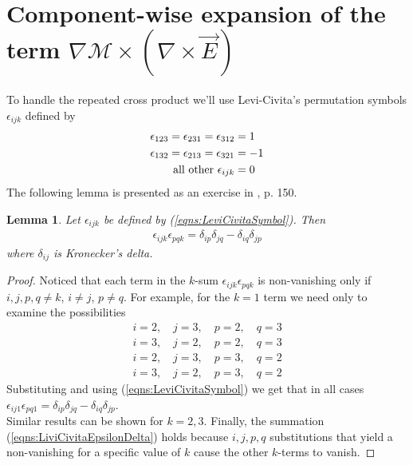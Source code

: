 \documentclass[twocolumn,secnumarabic,amssymb, nobibnotes, aps, prd]{revtex4-1}
\newtheorem{lem}{Lemma}[subsubsection]
\newtheorem{proof}{Proof}[subsubsection]
\begin{document}
\section{Component-wise expansion of the term $\nabla \mathcal{M} \times \left(\nabla \times \vec{E} \right) $}

\label{append:GradLogTermComponenetwiseDeriv}
To handle the repeated cross product we'll use Levi-Civita's permutation symbols $\epsilon_{ijk}$ \cite{ArfkenWeber2005} defined by
\begin{align}
\label{eqns:LeviCivitaSymbol}
\epsilon_{123} = \epsilon_{231} = \epsilon_{312} & = 1	\notag\\
\epsilon_{132} = \epsilon_{213} = \epsilon_{321} &= -1 \\
\text{all other } \epsilon_{ijk} &= 0	\notag
\end{align}
The following lemma is presented as an exercise in \cite{ArfkenWeber2005}, p. 150.
\begin{lem}
\label{lem:LiviCivitaEpsDelta}
Let $\epsilon_{ijk}$ be defined by (\ref{eqns:LeviCivitaSymbol}). Then
\begin{align}
\label{eqns:LiviCivitaEpsilonDelta} 
\epsilon_{ijk} \epsilon_{pqk} = \delta_{ip} \delta_{jq} - \delta_{iq} \delta_{jp}
\end{align} 
where $\delta_{ij}$ is Kronecker's delta.
\end{lem}

\begin{proof}
Noticed that each term in the $k$-sum $\epsilon_{ijk} \epsilon_{pqk}$ is non-vanishing only if $i,j,p,q \neq k$, $i \neq j$, $p \neq q$. For example, for the $k=1$ term we need only to examine the possibilities 
\begin{align*}
i=2,\quad j=3, \quad p=2, \quad q=3	\\
i=3,\quad j=2, \quad p=2, \quad q=3	\\
i=2,\quad j=3, \quad p=3, \quad q=2	\\
i=3,\quad j=2, \quad p=3, \quad q=2
\end{align*} 
Substituting and using (\ref{eqns:LeviCivitaSymbol}) we get that in all cases  $\epsilon_{ij1} \epsilon_{pq1} =  \delta_{ip} \delta_{jq} - \delta_{iq} \delta_{jp}$.\\
Similar results can be shown for $k=2,3$. Finally, the summation (\ref{eqns:LiviCivitaEpsilonDelta}) holds because $i,j,p,q$ substitutions that yield a non-vanishing for a specific value of $k$ cause the other $k$-terms to vanish.
\end{proof}
\end{document}
